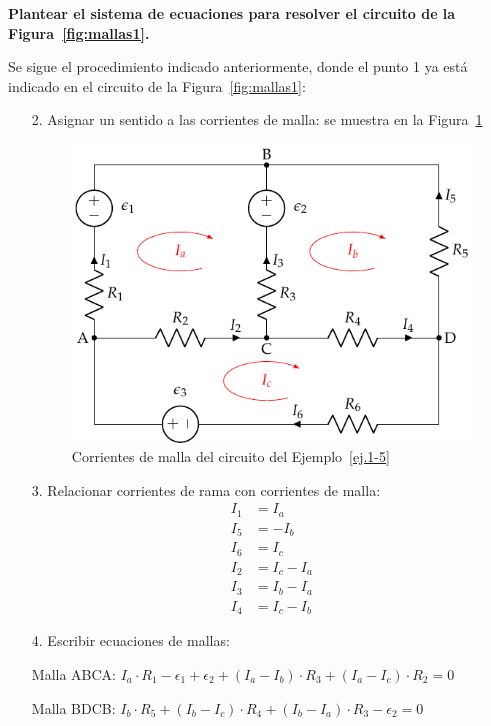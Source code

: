 	\begin{example}
          \label{ej.1-5}
          \textbf{Plantear el sistema de ecuaciones para resolver el
            circuito de la Figura~\ref{fig:mallas1}.}
		
          Se sigue el procedimiento indicado anteriormente, donde el
          punto 1 ya está indicado en el circuito de la
          Figura~\ref{fig:mallas1}:
          \begin{enumerate}
          \item[2.] Asignar un sentido a las corrientes de malla: se
            muestra en la Figura~\ref{fig:mallas1_corrientes}
            \begin{figure}[H]
              \centering
              \includegraphics[width=0.5\linewidth]{../figs/mallas1_corrientes.pdf}
              \caption{Corrientes de malla del circuito del
                Ejemplo~\ref{ej.1-5}}
              \label{fig:mallas1_corrientes}
            \end{figure}
          \item[3.] Relacionar corrientes de rama con corrientes de
            malla:
            \begin{align*}
              I_1 &= I_a\\
              I_5 &= -I_b\\
              I_6 &= I_c\\
              I_2 &= I_c -I_a\\
              I_3 &= I_b - I_a\\
              I_4 &= I_c - I_b
            \end{align*}
          \item[4.] Escribir ecuaciones de mallas:
			
            Malla ABCA:
            $I_a \cdot R_1 - \epsilon_1 + \epsilon_2 + (I_a - I_b)
            \cdot R_3 + (I_a - I_c) \cdot R_2 = 0$
			
            Malla BDCB:
            $I_b \cdot R_5 + (I_b - I_c) \cdot R_4 + (I_b - I_a) \cdot
            R_3 - \epsilon_2 = 0$
			

\end{enumerate}
\end{example}
